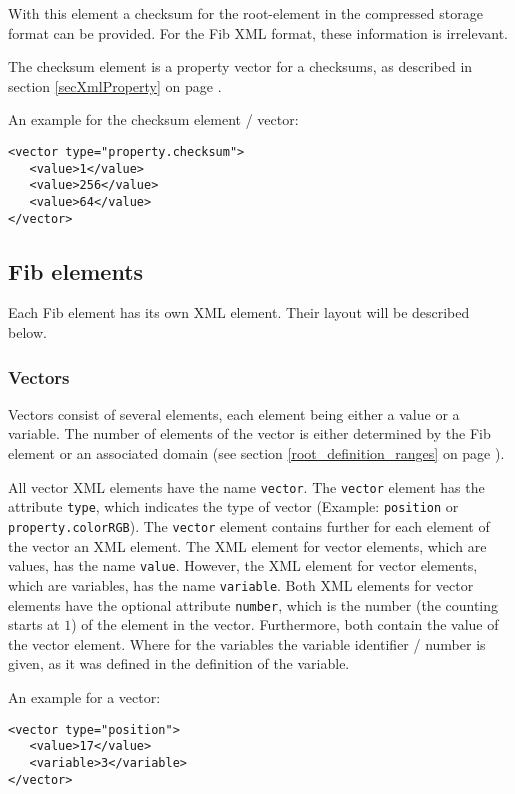With this element a checksum for the root-element in the compressed storage format can be provided. For the Fib XML format, these information is irrelevant.

The checksum element is a property vector for a checksums, as described in section \ref{secXmlProperty} on page \pageref{secXmlProperty}.

\bigskip\noindent
An example for the checksum element / vector:
\begin{verbatim}
<vector type="property.checksum">
   <value>1</value>
   <value>256</value>
   <value>64</value>
</vector>
\end{verbatim}



\subsection{Fib elements}
\label{secXmlFibElement}

Each Fib element has its own XML element. Their layout will be described below.


\subsubsection{Vectors}
\label{secXmlVector}

Vectors consist of several elements, each element being either a value or a variable. The number of elements of the vector is either determined by the Fib element or an associated domain (see section \ref{root_definition_ranges} on page \pageref{root_definition_ranges}).

All vector XML elements have the name \verb|vector|. The \verb|vector| element has the attribute \verb|type|, which indicates the type of vector (Example: \verb|position| or \verb|property.colorRGB|). The \verb|vector| element contains further for each element of the vector an XML element. The XML element for vector elements, which are values, has the name \verb|value|. However, the XML element for vector elements, which are variables, has the name \verb|variable|.
Both XML elements for vector elements have the optional attribute \verb|number|, which is the number (the counting starts at $1$) of the element in the vector. Furthermore, both contain the value of the vector element. Where for the variables the variable identifier / number is given, as it was defined in the definition of the variable.

\bigskip\noindent
An example for a vector:
\begin{verbatim}
<vector type="position">
   <value>17</value>
   <variable>3</variable>
</vector>
\end{verbatim}

